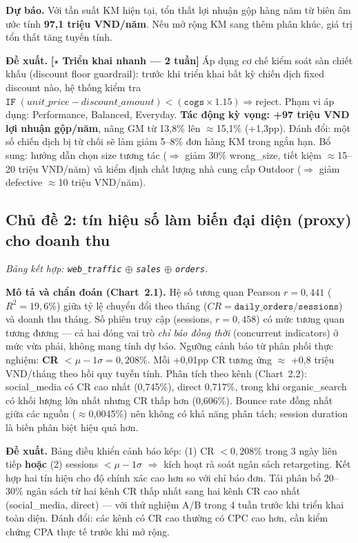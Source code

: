 \documentclass{article}
\begin{document}
\textbf{Dự báo.} Với tần suất KM hiện tại, tổn thất lợi nhuận gộp hàng năm từ biên âm ước tính \textbf{97,1 triệu VND/năm}. Nếu mở rộng KM sang thêm phân khúc, giá trị tổn thất tăng tuyến tính.

\textbf{Đề xuất.} \textbf{[$\star$ Triển khai nhanh --- 2 tuần]} Áp dụng cơ chế kiểm soát sàn chiết khấu (discount floor guardrail): trước khi triển khai bất kỳ chiến dịch fixed discount nào, hệ thống kiểm tra $\texttt{IF}\;(unit\_price - discount\_amount) < (\texttt{cogs} \times 1.15) \Rightarrow \text{reject}$. Phạm vi áp dụng: Performance, Balanced, Everyday. \textbf{Tác động kỳ vọng: +97 triệu VND lợi nhuận gộp/năm}, nâng GM từ 13,8\% lên $\approx$15,1\% (+1,3pp). Đánh đổi: một số chiến dịch bị từ chối sẽ làm giảm 5--8\% đơn hàng KM trong ngắn hạn. Bổ sung: hướng dẫn chọn size tương tác ($\Rightarrow$ giảm 30\% wrong\_size, tiết kiệm $\approx$15--20 triệu VND/năm) và kiểm định chất lượng nhà cung cấp Outdoor ($\Rightarrow$ giảm defective $\approx$10 triệu VND/năm).

\subsection{Chủ đề 2: tín hiệu số làm biến đại diện (proxy) cho doanh thu}
\label{sec:theme2}
\textit{Bảng kết hợp: \texttt{web\_traffic} $\oplus$ \texttt{sales} $\oplus$ \texttt{orders}.}

\textbf{Mô tả và chẩn đoán (Chart~2.1).} Hệ số tương quan Pearson $r = 0,441$ ($R^2 = 19,6\%$) giữa tỷ lệ chuyển đổi theo tháng ($CR = \texttt{daily\_orders}/\texttt{sessions}$) và doanh thu tháng. Số phiên truy cập (sessions, $r = 0,458$) có mức tương quan tương đương --- cả hai đóng vai trò \textit{chỉ báo đồng thời} (concurrent indicators) ở mức vừa phải, không mang tính dự báo. Ngưỡng cảnh báo từ phân phối thực nghiệm: \textbf{CR $< \mu - 1\sigma = 0,208\%$}. Mỗi +0,01pp CR tương ứng $\approx$ +0,8 triệu VND/tháng theo hồi quy tuyến tính. Phân tích theo kênh (Chart~2.2): social\_media có CR cao nhất (0,745\%), direct 0,717\%, trong khi organic\_search có khối lượng lớn nhất nhưng CR thấp hơn (0,606\%). Bounce rate đồng nhất giữa các nguồn ($\approx$0,0045\%) nên không có khả năng phân tách; session duration là biến phân biệt hiệu quả hơn.

\textbf{Đề xuất.} Bảng điều khiển cảnh báo kép: (1) CR $< 0,208\%$ trong 3 ngày liên tiếp \textbf{hoặc} (2) sessions $< \mu - 1\sigma$ $\Rightarrow$ kích hoạt rà soát ngân sách retargeting. Kết hợp hai tín hiệu cho độ chính xác cao hơn so với chỉ báo đơn. Tái phân bổ 20--30\% ngân sách từ hai kênh CR thấp nhất sang hai kênh CR cao nhất (social\_media, direct) --- với thử nghiệm A/B trong 4 tuần trước khi triển khai toàn diện. Đánh đổi: các kênh có CR cao thường có CPC cao hơn, cần kiểm chứng CPA thực tế trước khi mở rộng.
\end{document}
